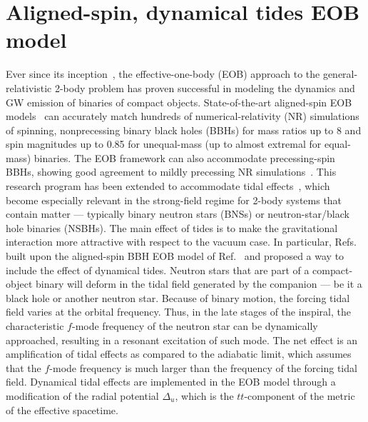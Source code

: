 \documentclass[prd,aps,letter,twocolumn,floatfix,notitlepage]{revtex4-1}
\begin{document}
\section{Aligned-spin, dynamical tides EOB model}
Ever since its inception~\cite{Buonanno:1998gg}, the effective-one-body (EOB) approach to the general-relativistic 2-body problem has proven successful in modeling the dynamics and GW emission of binaries of compact objects. State-of-the-art aligned-spin EOB models~\cite{Bohe:2016gbl,Nagar:2017jdw} can accurately match hundreds of numerical-relativity (NR) simulations of spinning, nonprecessing binary black holes (BBHs) for mass ratios up to 8 and spin magnitudes up to 0.85 for unequal-mass (up to almost extremal for equal-mass) binaries. The EOB framework can also accommodate precessing-spin BBHs, showing good agreement to mildly precessing NR simulations~\cite{Babak:2016tgq}. This research program has been extended to accommodate tidal effects~\cite{Damour:2009wj,Vines:2010ca,Damour:2012yf,Bini:2012gu,Bernuzzi:2014owa,Hinderer:2016eia,Steinhoff:2016rfi,Dietrich:2017feu}, which become especially relevant in the strong-field regime for 2-body systems that contain matter --- typically binary neutron stars (BNSs) or neutron-star/black hole binaries (NSBHs). The main effect of tides is to make the gravitational interaction more attractive with respect to the vacuum case. In particular, Refs.~\cite{Hinderer:2016eia,Steinhoff:2016rfi} built upon the aligned-spin BBH EOB model of Ref.~\cite{Taracchini:2013rva} and proposed a way to include the effect of dynamical tides. Neutron stars that are part of a compact-object binary will deform in the tidal field generated by the companion --- be it a black hole or another neutron star. Because of binary motion, the forcing tidal field varies at the orbital frequency. Thus, in the late stages of the inspiral, the characteristic $f$-mode frequency of the neutron star can be dynamically approached, resulting in a resonant excitation of such mode. The net effect is an amplification of tidal effects as compared to the adiabatic limit, which assumes that the $f$-mode frequency is much larger than the frequency of the forcing tidal field. Dynamical tidal effects are implemented in the EOB model through a modification of the radial potential $\Delta_u$, which is the $tt$-component of the metric of the effective spacetime. 
\end{document}
